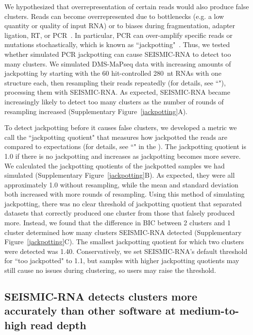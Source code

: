 \documentclass[unnumsec,webpdf,contemporary,large]{oup-authoring-template}%
\theoremstyle{thmstyleone}%
\theoremstyle{thmstyletwo}%
\theoremstyle{thmstylethree}%
\begin{document}
We hypothesized that overrepresentation of certain reads would also produce false clusters.
Reads can become overrepresented due to bottlenecks (e.g. a low quantity or quality of input RNA) or to biases during fragmentation, adapter ligation, RT, or PCR~\cite{Shi2021}.
In particular, PCR can over-amplify specific reads or mutations stochastically, which is known as ``jackpotting"~\cite{Marotz2019}.
Thus, we tested whether simulated PCR jackpotting can cause SEISMIC-RNA to detect too many clusters.
We simulated DMS-MaPseq data with increasing amounts of jackpotting by starting with the 60 hit-controlled 280~nt RNAs with one structure each, then resampling their reads repeatedly (for details, see ``"), processing them with SEISMIC-RNA.
As expected, SEISMIC-RNA became increasingly likely to detect too many clusters as the number of rounds of resampling increased (Supplementary Figure~\ref{jackpotting}A).

To detect jackpotting before it causes false clusters, we developed a metric we call the ``jackpotting quotient" that measures how jackpotted the reads are compared to expectations (for details, see ``" in the ).
The jackpotting quotient is 1.0 if there is no jackpotting and increases as jackpotting becomes more severe.
We calculated the jackpotting quotients of the jackpotted samples we had simulated (Supplementary Figure~\ref{jackpotting}B).
As expected, they were all approximately 1.0 without resampling, while the mean and standard deviation both increased with more rounds of resampling.
Using this method of simulating jackpotting, there was no clear threshold of jackpotting quotient that separated datasets that correctly produced one cluster from those that falsely produced more.
Instead, we found that the difference in BIC between 2 clusters and 1 cluster determined how many clusters SEISMIC-RNA detected (Supplementary Figure~\ref{jackpotting}C).
The smallest jackpotting quotient for which two clusters were detected was 1.40.
Conservatively, we set SEISMIC-RNA's default threshold for ``too jackpotted" to 1.1, but samples with higher jackpotting quotients may still cause no issues during clustering, so users may raise the threshold.


\subsection{SEISMIC-RNA detects clusters more accurately than other software at medium-to-high read depth}
\end{document}
